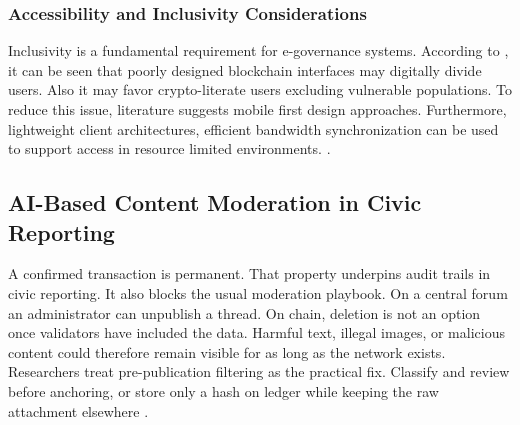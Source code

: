\subsubsection*{Accessibility and Inclusivity Considerations}

Inclusivity is a fundamental requirement for e-governance systems. According to \cite{bertrand2023connected}, it can be seen that poorly designed blockchain interfaces may digitally divide users. Also it may favor crypto-literate users excluding vulnerable populations. To reduce this issue, literature suggests mobile first design approaches. Furthermore, lightweight client architectures, efficient bandwidth synchronization can be used to support access in resource limited environments.  \cite{shahin2025towards}.  



\subsection{\ac{AI}-Based Content Moderation in Civic Reporting}

A confirmed transaction is permanent. That property underpins audit trails in civic reporting. It also blocks the usual moderation playbook. On a central forum an administrator can unpublish a thread. On chain, deletion is not an option once validators have included the data. Harmful text, illegal images, or malicious content could therefore remain visible for as long as the network exists. Researchers treat pre-publication filtering as the practical fix. Classify and review before anchoring, or store only a hash on ledger while keeping the raw attachment elsewhere \cite{dzone2026blockchainai}.

